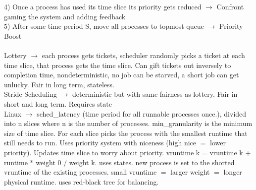 \documentclass[8pt]{article}
\begin{document}
4) Once a process has used its time slice its priority gets reduced $\rightarrow$ Confront gaming the system and adding feedback\\
5) After some time period S, move all processes to topmost queue $\rightarrow$ Priority Boost\\
\\
Lottery $\rightarrow$ each process gets tickets, scheduler randomly picks a ticket at each time slice, that process gets the time slice. Can gift tickets
out inversely to completion time, nondeterministic, no job can be starved, a short job can get unlucky. Fair in long term, stateless.
\\
Stride Scheduling $\rightarrow$ deterministic but with same fairness as lottery. Fair in short and long term. Requires state
\\
Linux $\rightarrow$ sched\_latency (time period for all runnable processes once.), divided into n slices where n is the number of processes. min\_granularity is the minimum size of time slice.
For each slice picks the process with the smallest runtime that still needs to run. Uses priority system with niceness (high nice $=$ lower priority).
Updates time slice to worry about priority. vruntime k = vruntime k + runtime * weight 0 / weight k. uses states. new process is set to the shorted vruntime
of the existing processes. small vruntime $=$ larger weight $=$ longer physical runtime. uses red-black tree for balancing.
\end{document}
